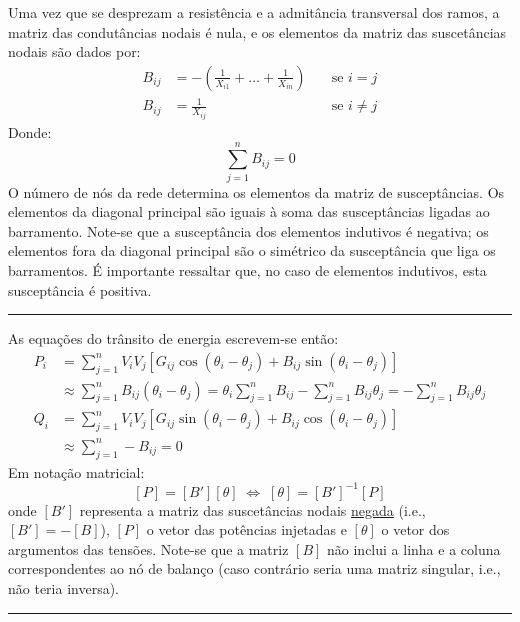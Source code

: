 \noindent Uma vez que se desprezam a resistência e a admitância transversal dos ramos, a matriz das condutâncias nodais é nula, e os elementos da matriz das suscetâncias nodais são dados por:
$$
\begin{aligned}
    B_{ij} &= - \left( \frac{1}{X_{i1}} + \dots + \frac{1}{X_{in}} \right) & \quad \text{se } i = j \\
    B_{ij} &= \frac{1}{X_{ij}} & \quad \text{se } i \neq j
\end{aligned}
$$
Donde:
$$
    \sum_{j=1}^{n} B_{ij} = 0
$$
O número de nós da rede determina os elementos da matriz de susceptâncias. Os elementos da diagonal principal são iguais à soma das susceptâncias ligadas ao barramento. Note-se que a susceptância dos elementos indutivos é negativa; os elementos fora da diagonal principal são o simétrico da susceptância que liga os barramentos. É importante ressaltar que, no caso de elementos indutivos, esta susceptância é positiva.

\vspace{0.5em}\hrule\vspace{0.5em}

\noindent As equações do trânsito de energia escrevem-se então:
$$
\begin{aligned}
    P_i &= \sum_{j=1}^{n} V_i V_j [G_{ij} \cos(\theta_i - \theta_j) + B_{ij} \sin(\theta_i - \theta_j)] \\
    &\approx \sum_{j=1}^{n} B_{ij} (\theta_i - \theta_j) = \theta_i \sum_{j=1}^{n} B_{ij} - \sum_{j=1}^{n} B_{ij} \theta_j = - \sum_{j=1}^{n} B_{ij} \theta_j  \\
    Q_i &= \sum_{j=1}^{n} V_i V_j [G_{ij} \sin(\theta_i - \theta_j) + B_{ij} \cos(\theta_i - \theta_j)] \\
    &\approx \sum_{j=1}^{n} -B_{ij} = 0
\end{aligned}
$$
Em notação matricial:
$$
    [P] = [B'] [\theta] \;\iff\; [\theta] = [B']^{-1} [P]
$$
onde $[B']$ representa a matriz das suscetâncias nodais \underline{negada} (i.e., $[B'] = -[B]$), $[P]$ o vetor das potências injetadas e $[\theta]$ o vetor dos argumentos das tensões. Note-se que a matriz $[B]$ não inclui a linha e a coluna correspondentes ao nó de balanço (caso contrário seria uma matriz singular, i.e., não teria inversa).

\vspace{0.5em}\hrule\vspace{0.5em}

